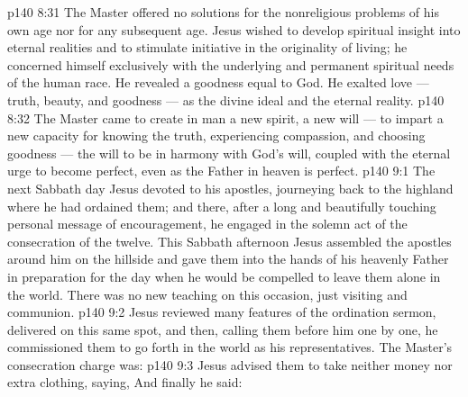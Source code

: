 \vs p140 8:31 The Master offered no solutions for the nonreligious problems of his own age nor for any subsequent age. Jesus wished to develop spiritual insight into eternal realities and to stimulate initiative in the originality of living; he concerned himself exclusively with the underlying and permanent spiritual needs of the human race. He revealed a goodness equal to God. He exalted love --- truth, beauty, and goodness --- as the divine ideal and the eternal reality.
\vs p140 8:32 The Master came to create in man a new spirit, a new will --- to impart a new capacity for knowing the truth, experiencing compassion, and choosing goodness --- the will to be in harmony with God’s will, coupled with the eternal urge to become perfect, even as the Father in heaven is perfect.
\vs p140 9:1 The next Sabbath day Jesus devoted to his apostles, journeying back to the highland where he had ordained them; and there, after a long and beautifully touching personal message of encouragement, he engaged in the solemn act of the consecration of the twelve. This Sabbath afternoon Jesus assembled the apostles around him on the hillside and gave them into the hands of his heavenly Father in preparation for the day when he would be compelled to leave them alone in the world. There was no new teaching on this occasion, just visiting and communion.
\vs p140 9:2 Jesus reviewed many features of the ordination sermon, delivered on this same spot, and then, calling them before him one by one, he commissioned them to go forth in the world as his representatives. The Master’s consecration charge was: 
\vs p140 9:3 Jesus advised them to take neither money nor extra clothing, saying,  And finally he said: 
